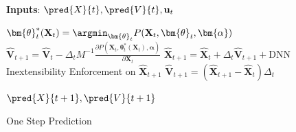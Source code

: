 \begin{figure}
      \vspace*{-0.65cm}
    \begin{minipage}{0.6\textwidth}
      \begin{algorithm}[H]
\caption{One Step Prediction} 
\label{alg:long time horizon}
\textbf{Inputs}: $\pred{X}{t}, \pred{V}{t}, \textbf{u}_t$
\begin{algorithmic}[1]
\State $\bm{\theta}^*_t(\textbf{X}_t) = \argmin_{\bm{\theta}_t} P(\textbf{X}_t, \bm{\theta}_t,\bm{\alpha})$ 
\State $\hat{\textbf{V}}_{t+1} = \hat{\textbf{V}}_t-\Delta_tM^{-1}\frac{\partial P(\textbf{X}_t, \bm{\theta}^*_t(\textbf{X}_t),\bm{\alpha})}{\partial \textbf{X}_{t}}$ \Comment{\eqref{eq:Semi-Euler2}}   
\State $\hat{\textbf{X}}_{t+1} = \hat{\textbf{X}}_t + \Delta_t\hat{\textbf{V}}_{t+1} + \text{DNN}$ 
\State Inextensibility Enforcement on $\hat{\textbf{X}}_{t+1}$ 
\State $\hat{\textbf{V}}_{t+1} = (\hat{\textbf{X}}_{t+1} - \hat{\textbf{X}}_t)\Delta_t$ 
\end{algorithmic}
\Return $\pred{X}{t+1}, \pred{V}{t+1}$
\end{algorithm}
    \end{minipage}
  \end{figure}


